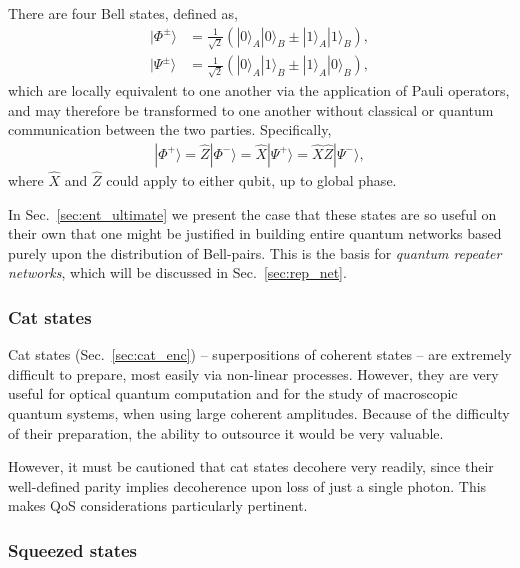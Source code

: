 \documentclass[aps, rmp, twocolumn, amsmath, amssymb, nofootinbib, superscriptaddress, longbibliography, floatfix, table-of-contents, eqsecnum]{revtex4-1}
\newcommand{\ket}[1]{|#1\rangle}
\begin{document}
There are four Bell states, defined as, 
\begin{align} \label{eq:bell_basis}
\ket{\Phi^{\pm}} &= \frac{1}{\sqrt{2}} (\ket{0}_A\ket{0}_B \pm \ket{1}_A\ket{1}_B), \nonumber \\
\ket{\Psi^{\pm}} &= \frac{1}{\sqrt{2}} (\ket{0}_A\ket{1}_B \pm \ket{1}_A\ket{0}_B),
\end{align}
which are locally equivalent to one another via the application of Pauli operators, and may therefore be transformed to one another without classical or quantum communication between the two parties. Specifically,
\begin{align}
\ket{\Phi^+} = \hat{Z}\ket{\Phi^-} = \hat{X}\ket{\Psi^+} = \hat{X}\hat{Z}\ket{\Psi^-},
\end{align}
where $\hat{X}$ and $\hat{Z}$ could apply to either qubit, up to global phase.

In Sec.~\ref{sec:ent_ultimate} we present the case that these states are so useful on their own that one might be justified in building entire quantum networks based purely upon the distribution of Bell-pairs. This is the basis for \textit{quantum repeater networks}, which will be discussed in Sec.~\ref{sec:rep_net}.

%
%

\subsubsection{Cat states} 

Cat states (Sec.~\ref{sec:cat_enc}) -- superpositions of coherent states -- are extremely difficult to prepare, most easily via non-linear processes. However, they are very useful for optical quantum computation and for the study of macroscopic quantum systems, when using large coherent amplitudes. Because of the difficulty of their preparation, the ability to outsource it would be very valuable.

However, it must be cautioned that cat states decohere very readily, since their well-defined parity implies decoherence upon loss of just a single photon. This makes QoS considerations particularly pertinent.

%
%

\subsubsection{Squeezed states} \label{sec:squeezed} 
\end{document}
